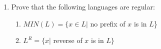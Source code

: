 \documentclass{article}%
\begin{document}
\begin{enumerate}

	\item Prove that the following languages are regular:
	\begin{enumerate}
	\item  $MIN(L) = \{ x \in L |$ no prefix of $x$ is in $L$\}
	\item  $L^R  = \{ x|$ reverse of $x$ is in $L\}$
	\end{enumerate}

	
\end{enumerate}
\end{document}
